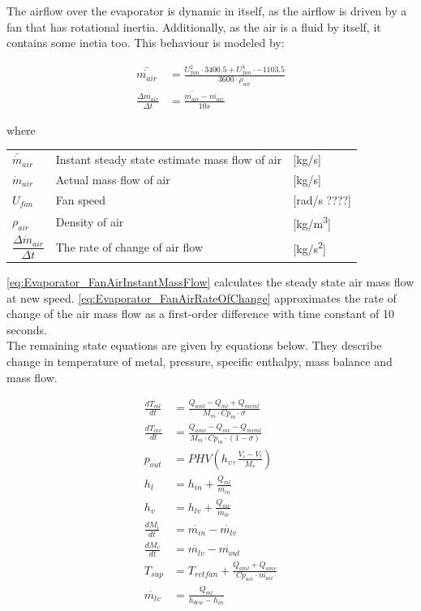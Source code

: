 The airflow over the evaporator is dynamic in itself, as the airflow is driven by a fan that has rotational inertia. Additionally, as the air is a fluid by itself, it contains some inetia too. This behaviour is modeled by:

\begin{align}
	\bar{\dot{m_{air}}} & = \frac{U_{fan}^2 \cdot 3400.5 + U_{fan}^3 \cdot -1103.5} {3600 \cdot \rho_{air}} \label{eq:Evaporator_FanAirInstantMassFlow}\\ 
	\frac{\Delta \dot{m_{air}}}{\Delta t} & = \frac{\bar{\dot{m_{air}}} - \dot{m_{air}}} {10s} \label{eq:Evaporator_FanAirRateOfChange}
\end{align} 

where

\begin{center}
	\begin{tabular}{l p{8cm} l}
		$\bar{\dot{m}}_{air}$						& Instant steady state estimate mass flow of air  		& [\si{kg}/\si{s}] \\		
		$\dot{m}_{air}$								& Actual mass flow of air								& [\si{kg}/\si{s}] \\		
		$U_{fan}$									& Fan speed 											& [rad/s ????] \\		
		$\rho_{air}$								& Density of air										& [\si{kg}/\si{m^3}] \\[0.2cm]		
		$\dfrac{\Delta \dot{m}_{air}}{\Delta t} $ 	& The rate of change of	air flow 						& [\si{kg}/\si{s^2}]
	\end{tabular}
\end{center}

\cref{eq:Evaporator_FanAirInstantMassFlow} calculates the steady state air mass flow at new speed. \cref{eq:Evaporator_FanAirRateOfChange} approximates the rate of change of the air mass flow as a first-order difference with time constant of 10 seconds. \\

The remaining state equations are given by equations below. They describe change in temperature of metal, pressure, specific enthalpy, mass balance and mass flow.

\begin{align}
	\frac{dT_{ml}}{dt} & = \frac{Q_{aml}-Q_{ml} + Q_{mvml}}{M_m \cdot Cp_m \cdot \sigma} \\
	\frac{dT_{mv}}{dt} & = \frac{Q_{amv} - Q_{mv} - Q_{mvml}}{M_m \cdot Cp_m \cdot (1- \sigma)} \\
	p_{out} & = PHV \left( h_v, \frac{V_i-V_l}{M_v} \right)\\
	h_l & = h_{in} + \frac{Q_{ml}}{\dot{m_{in}}}\\
	h_v & = h_{lv} + \frac{Q_{mv}}{\dot{m_{lv}}}\\
	\frac{dM_l}{dt} & = \dot{m_{in}} - \dot{m_{lv}}\\
	\frac{dM_v}{dt} & = \dot{m_{lv}} - \dot{m_{out}}\\
	T_{sup} & = T_{retfan} +  \frac{Q_{aml} + Q_{amv}}{Cp_{air} \cdot \dot{m_{air}}} \\
	\dot{m_{lv}} & = \frac{Q_{ml}}{h_{dew} - h_{in}}
\end{align}


